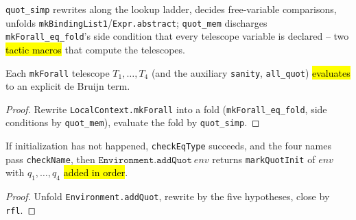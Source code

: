 \begin{definition}
\label{def:quot-tactics}
\leanok
{}

 \texttt{quot\_simp} rewrites along the lookup ladder, decides
free-variable comparisons, unfolds \texttt{mkBindingList1}/\texttt{Expr.abstract};
\texttt{quot\_mem} discharges \texttt{mkForall\_eq\_fold}'s side condition that every
telescope variable is declared -- two \hl{tactic macros} that compute the telescopes.
\end{definition}

\begin{lemma}
\label{family:quot-type-eqs}
\leanok
{}

 Each \texttt{mkForall} telescope $T_1,\ldots,T_4$ (and the auxiliary
\texttt{sanity}, \texttt{all\_quot}) \hl{evaluates} to an explicit de Bruijn term.
\end{lemma}
\begin{proof}
\leanok
{} Rewrite \texttt{LocalContext.mkForall} into a fold
(\texttt{mkForall\_eq\_fold}, side conditions by \texttt{quot\_mem}), evaluate the fold by
\texttt{quot\_simp}.
\end{proof}

\begin{lemma}
\label{thm:add-quot-eq}
\leanok
{}

 If initialization has not happened, \texttt{checkEqType} succeeds, and the
four names pass \texttt{checkName}, then $\mathtt{Environment.addQuot}\ env$ returns
\texttt{markQuotInit} of $env$ with $q_1,\ldots,q_4$ \hl{added in order}.
\end{lemma}
\begin{proof}
\leanok
{} Unfold \texttt{Environment.addQuot}, rewrite by the five hypotheses, close by
\texttt{rfl}.
\end{proof}

